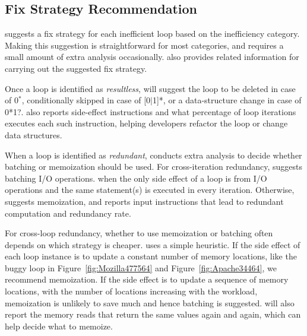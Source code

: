 \subsection{Fix Strategy Recommendation}
\label{sec:redundant_fix}

\Tool suggests a fix strategy for each inefficient loop based on the
inefficiency category. Making this suggestion is straightforward for
most categories, and requires a small amount of extra
analysis occasionally. \Tool also
provides related information for carrying out the suggested fix strategy. 

Once a loop is identified as \emph{resultless}, \Tool will suggest
the loop to be deleted in case of 0$^*$,
conditionally skipped in case of [0$|$1]*, or a
data-structure change in case of 0*1?.
\Tool also reports side-effect instructions 
and what percentage of loop iterations executes each such instruction,
helping developers refactor the loop or change data structures. 

When a loop is identified as \emph{redundant}, \Tool conducts
extra analysis to
decide whether batching or memoization should be used. 
For cross-iteration redundancy, \Tool suggests batching 
I/O operations.
when the only side effect of a loop is from I/O operations
and the same statement(s) is executed in every iteration.
Otherwise, \Tool suggests memoization, and reports
input instructions that lead to redundant computation and redundancy rate.

For cross-loop redundancy, whether to use memoization or batching often
depends on which strategy is cheaper.
\Tool uses a simple
heuristic. If 
the side effect of each loop instance is to update 
a constant number of memory locations, like the 
buggy loop in Figure~\ref{fig:Mozilla477564} and Figure~\ref{fig:Apache34464}, 
we recommend memoization. If the side effect is to update
a sequence of memory locations, with the number of locations increasing
with the workload, memoization is unlikely to save much and
hence batching is suggested.
\Tool will also report
the memory reads that return the same values
again and again, which can help decide what to memoize.

